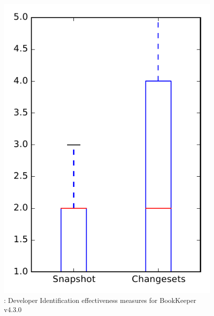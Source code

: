 
\begin{figure}
\centering
\includegraphics[height=0.4\textheight]{figures/dit/rq1_bookkeeper_no_outlier}
\caption{\done: Developer Identification effectiveness measures for BookKeeper v4.3.0}
\label{fig:dit:rq1:bookkeeper}
\end{figure}
